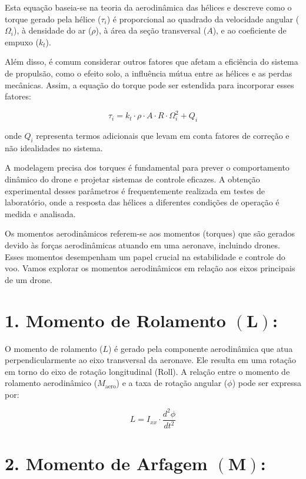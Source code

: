 Esta equação baseia-se na teoria da aerodinâmica das hélices e descreve como o torque gerado pela hélice ($\tau_i$) é proporcional ao quadrado da velocidade angular ($\Omega_i$), à densidade do ar ($\rho$), à área da seção transversal ($A$), e ao coeficiente de empuxo ($k_t$).

Além disso, é comum considerar outros fatores que afetam a eficiência do sistema de propulsão, como o efeito solo, a influência mútua entre as hélices e as perdas mecânicas. Assim, a equação do torque pode ser estendida para incorporar esses fatores:

\begin{equation}
	\tau_i = k_t \cdot \rho \cdot A \cdot R \cdot \Omega_i^2 + Q_i
\end{equation}

onde $Q_i$ representa termos adicionais que levam em conta fatores de correção e não idealidades no sistema.

A modelagem precisa dos torques é fundamental para prever o comportamento dinâmico do drone e projetar sistemas de controle eficazes. A obtenção experimental desses parâmetros é frequentemente realizada em testes de laboratório, onde a resposta das hélices a diferentes condições de operação é medida e analisada.


Os momentos aerodinâmicos referem-se aos momentos (torques) que são gerados devido às forças aerodinâmicas atuando em uma aeronave, incluindo drones. Esses momentos desempenham um papel crucial na estabilidade e controle do voo. Vamos explorar os momentos aerodinâmicos em relação aos eixos principais de um drone.

\section*{1. Momento de Rolamento $(\boldsymbol{L})$:}

O momento de rolamento (\(L\)) é gerado pela componente aerodinâmica que atua perpendicularmente ao eixo transversal da aeronave. Ele resulta em uma rotação em torno do eixo de rotação longitudinal (Roll). A relação entre o momento de rolamento aerodinâmico (\(M_{\text{aero}}\)) e a taxa de rotação angular (\(\phi\)) pode ser expressa por:

\[
	L = I_{xx} \cdot \frac{d^2 \phi}{dt^2}
\]

\section*{2. Momento de Arfagem $(\boldsymbol{M})$:}

